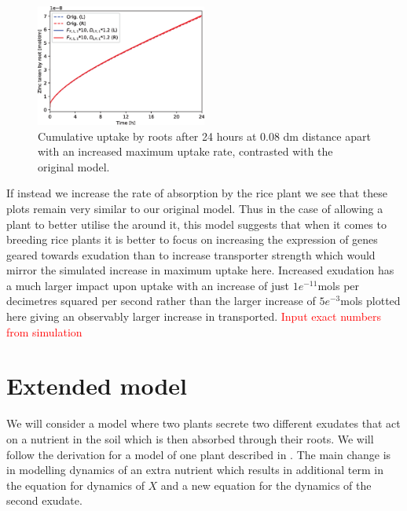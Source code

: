 \documentclass[11pt]{article}
\numberwithin{equation}{section}
\begin{document}
 \begin{figure}[h]
    \centering
    \includegraphics[width=0.5\textwidth]{Figures/testpics/ZnCumulative/IncreasedZnCumu.eps}
    \caption{Cumulative  uptake by roots after 24 hours at $0.08$ \si{dm} distance apart with an increased maximum  uptake rate, contrasted with the original model.}
\end{figure}
If instead we increase the rate of  absorption by the rice plant we see that these plots remain very similar to our original model. Thus in the case of allowing a plant to better utilise the  around it, this model suggests that when it comes to breeding rice plants it is better to focus on increasing the expression of genes geared towards  exudation than to increase transporter strength which would mirror the simulated increase in maximum  uptake here. Increased  exudation has a much larger impact upon  uptake with an increase of just $1e^{-11}$mols per decimetres squared per second rather than the larger increase of $5e^{-3}$mols plotted here giving an observably larger increase in  transported. \textcolor{red}{Input exact numbers from simulation}


\newpage


\section{Extended model}
\label{sec:Extension}
We will consider a model where two plants secrete two different exudates that act on a nutrient in the soil which is then absorbed through their roots. We will follow the derivation for a model of one plant described in \cite{Ptashnyk-2011}. The main change is in modelling dynamics of an extra nutrient which results in additional term in the equation for dynamics of $X$ and a new equation for the dynamics of the second exudate.
	
\end{document}
